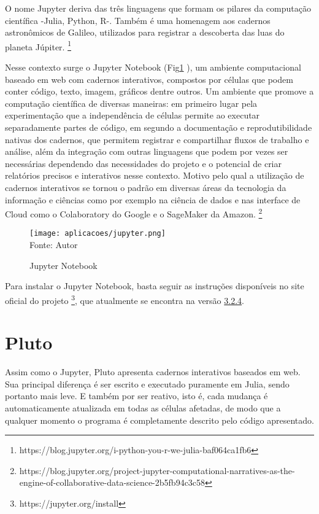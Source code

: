 O nome Jupyter deriva das três linguagens que formam os pilares da computação científica -Julia, Python, R-. Também é uma homenagem aos cadernos astronômicos de Galileo, utilizados para registrar a descoberta das luas do planeta Júpiter. \footnote{https://blog.jupyter.org/i-python-you-r-we-julia-baf064ca1fb6}

Nesse contexto surge o Jupyter Notebook (Fig\ref{jupyter} ), um ambiente computacional baseado em web com cadernos interativos, compostos por células que podem conter código, texto, imagem, gráficos dentre outros. Um ambiente que promove a computação científica de diversas maneiras: em primeiro lugar pela experimentação que a independência de células permite ao executar separadamente partes de código, em segundo a documentação e reprodutibilidade nativas dos cadernos, que permitem registrar e compartilhar fluxos de trabalho e análise, além da integração com outras linguagens que podem por vezes ser necessárias dependendo das necessidades do projeto e o potencial de criar relatórios precisos e interativos nesse contexto. Motivo pelo qual a utilização de cadernos interativos se tornou o padrão em diversas áreas da tecnologia da informação e ciências como por exemplo na ciência de dados e nas interface de Cloud como o Colaboratory do Google e o SageMaker da Amazon. \footnote{https://blog.jupyter.org/project-jupyter-computational-narratives-as-the-engine-of-collaborative-data-science-2b5fb94c3c58}

\begin{figure}[H]
\begin{center}
    \caption{Jupyter Notebook} \label{jupyter}
    \texttt{[image: aplicacoes/jupyter.png]} \\
    {\tiny \sf Fonte: Autor}
\end{center}
\end{figure} 



Para instalar o Jupyter Notebook, basta seguir as instruções disponíveis no site oficial do projeto \footnote{https://jupyter.org/install}, que atualmente se encontra na versão \href{https://github.com/jupyterlab/jupyterlab/releases/tag/v3.2.4}{3.2.4}.

\section{Pluto}
Assim como o Jupyter, Pluto apresenta cadernos interativos baseados em web. 
Sua principal diferença é ser escrito e executado puramente em Julia, sendo portanto mais leve. E também por ser reativo, isto é, cada mudança é automaticamente atualizada em todas as células afetadas, de modo que a qualquer momento o programa é completamente descrito pelo código apresentado. 

